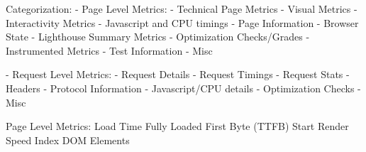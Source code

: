 Categorization:
- Page Level Metrics:
	- Technical Page Metrics
	- Visual Metrics
	- Interactivity Metrics
	- Javascript and CPU timings
	- Page Information
	- Browser State
	- Lighthouse Summary Metrics
	- Optimization Checks/Grades
	- Instrumented Metrics
	- Test Information
	- Misc


- Request Level Metrics:
	- Request Details
	- Request Timings
	- Request Stats
	- Headers
	- Protocol Information
	- Javascript/CPU details
	- Optimization Checks
	- Misc


Page Level Metrics:
Load Time
Fully Loaded
First Byte (TTFB)
Start Render
Speed Index
DOM Elements













